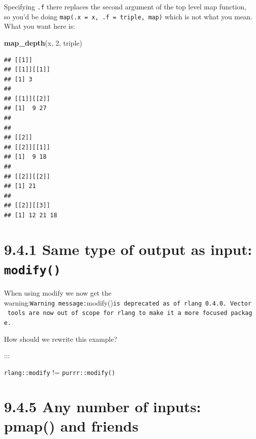 \documentclass[]{book}
\newenvironment{Shaded}{\begin{snugshade}}{\end{snugshade}}
\newcommand{\DataTypeTok}[1]{\textcolor[rgb]{0.13,0.29,0.53}{#1}}
\newcommand{\DecValTok}[1]{\textcolor[rgb]{0.00,0.00,0.81}{#1}}
\newcommand{\KeywordTok}[1]{\textcolor[rgb]{0.13,0.29,0.53}{\textbf{#1}}}
\newcommand{\NormalTok}[1]{#1}
\newcommand{\OperatorTok}[1]{\textcolor[rgb]{0.81,0.36,0.00}{\textbf{#1}}}
\newcommand{\StringTok}[1]{\textcolor[rgb]{0.31,0.60,0.02}{#1}}
\begin{document}
Specifying \texttt{.f} there replaces the second argument of the top level map function, so you'd be doing \texttt{map(.x\ =\ x,\ .f\ =\ triple,\ map)} which is not what you mean. What you want here is:

\begin{Shaded}
\begin{Highlighting}[]
\KeywordTok{map_depth}\NormalTok{(x, }\DecValTok{2}\NormalTok{, triple)}
\end{Highlighting}
\end{Shaded}

\begin{verbatim}
## [[1]]
## [[1]][[1]]
## [1] 3
## 
## [[1]][[2]]
## [1]  9 27
## 
## 
## [[2]]
## [[2]][[1]]
## [1]  9 18
## 
## [[2]][[2]]
## [1] 21
## 
## [[2]][[3]]
## [1] 12 21 18
\end{verbatim}

\hypertarget{same-type-of-output-as-input-modify}{%
\section*{\texorpdfstring{9.4.1 Same type of output as input: \texttt{modify()}}{9.4.1 Same type of output as input: modify()}}\label{same-type-of-output-as-input-modify}}

When using modify we now get the warning:\texttt{Warning\ message:}modify()\texttt{is\ deprecated\ as\ of\ rlang\ 0.4.0.\ Vector\ tools\ are\ now\ out\ of\ scope\ for\ rlang\ to\ make\ it\ a\ more\ focused\ package.}

How should we rewrite this example?

\begin{Shaded}
\end{Shaded}

:::

\texttt{rlang::modify} != \texttt{purrr::modify()}

\hypertarget{any-number-of-inputs-pmap-and-friends}{%
\section*{9.4.5 Any number of inputs: pmap() and friends}\label{any-number-of-inputs-pmap-and-friends}}
\end{document}
